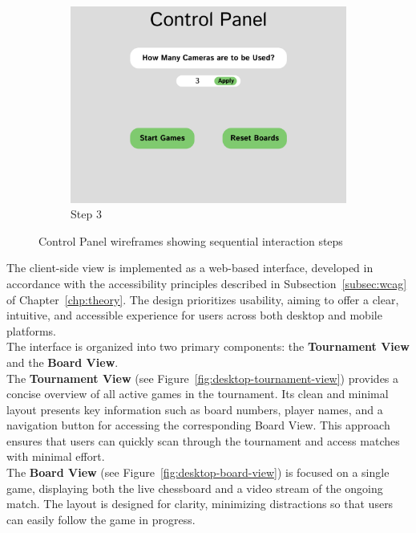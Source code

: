 \begin{figure}[h!]
    \begin{subfigure}[h!]{0.40\linewidth}
        \centering
        \includegraphics[width=\linewidth]{figures/methods/wireframes/control-panel-3.png}
        \caption{Step 3}
        \label{fig:control-panel-3}
    \end{subfigure}
    
    \caption[Control panel wireframes]{Control Panel wireframes showing sequential interaction steps}
    \label{fig:control-panel-group}
\end{figure}


The client-side view is implemented as a web-based interface, developed in accordance with the accessibility principles described in Subsection~\ref{subsec:wcag} of Chapter~\ref{chp:theory}. The design prioritizes usability, aiming to offer a clear, intuitive, and accessible experience for users across both desktop and mobile platforms. \\

The interface is organized into two primary components: the \textbf{Tournament View} and the \textbf{Board View}. \\

The \textbf{Tournament View} (see Figure~\ref{fig:desktop-tournament-view}) provides a concise overview of all active games in the tournament. Its clean and minimal layout presents key information such as board numbers, player names, and a navigation button for accessing the corresponding Board View. This approach ensures that users can quickly scan through the tournament and access matches with minimal effort. \\

The \textbf{Board View} (see Figure~\ref{fig:desktop-board-view}) is focused on a single game, displaying both the live chessboard and a video stream of the ongoing match. The layout is designed for clarity, minimizing distractions so that users can easily follow the game in progress. \\


